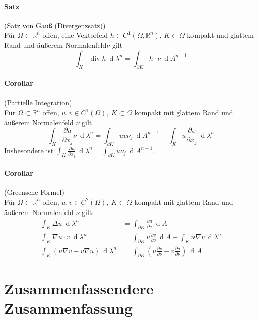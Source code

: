 \documentclass[12pt,a4paper,fleqn]{article}
\def\R{{\mathbb{R}}}
\def\d{{\operatorname{d}}}
\begin{document}
\paragraph{Satz} (Satz von Gauß (Divergenzsatz))\\
Für $\Omega \subset \R^n$ offen, eine Vektorfeld $h \in C^1(\Omega, \R^n)$, $K\subset \Omega$ kompakt und glattem Rand und äußerem Normalenfeld$\nu$ gilt
\begin{displaymath}
\int_K \operatorname{div} h\ \d\lambda^n = \int_{\partial K} h \cdot \nu\ \d A^{n-1}
\end{displaymath}

\paragraph{Corollar} (Partielle Integration)\\
Für $\Omega \subset \R^n$ offen, $u, v \in C^1(\Omega),\ K\subset\Omega$ kompakt mit glattem Rand und äußerem Normalenfeld $\nu$ gilt
\begin{displaymath}
\int_K\frac{\partial u}{\partial x_j} \nu\ \d\lambda^n = \int_{\partial K} uv\nu_j\ \d A^{n-1} - \int_K u\frac{\partial v}{\partial x_j}\ \d\lambda^n
\end{displaymath}
Insbesondere ist $\int_K \frac{\partial u}{\partial x_j}\ \d\lambda^n = \int_{\partial K} u\nu_j\ \d A^{n-1}$.

\paragraph{Corollar} (Greensche Formel)\\
Für $\Omega \subset \R^n$ offen, $u, v \in C^2(\Omega),\ K\subset \Omega$ kompakt mit glattem Rand und äußerem Normalenfeld $\nu$ gilt:
\begin{align*}
\int_K  \Delta u\ \d\lambda^n &= \int_{\partial K} \frac{\partial u}{\partial \nu}\ \d A\\
\int_K \nabla u \cdot v\ \d\lambda^n &= \int_{\partial K} u\frac{\partial v}{\partial \nu}\ \d A - \int_K u\nabla v\ \d\lambda^n\\
\int_K(u\nabla v - v\nabla u)\ \d\lambda^n &= \int_{\partial K} \left(u\frac{\partial v}{\partial \nu} - v\frac{\partial u}{\partial \nu}\right)\ \d A
\end{align*}

\newpage

\section{Zusammenfassendere Zusammenfassung}
\end{document}
